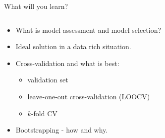 \documentclass[10pt,ignorenonframetext,]{beamer}
\providecommand{\tightlist}{%
  \setlength{\itemsep}{0pt}\setlength{\parskip}{0pt}}
\begin{document}
\begin{frame}

\begin{block}{What will you learn?}

\(~\)

\begin{itemize}
\tightlist
\item
  What is model assessment and model selection?
\end{itemize}

\vspace{2mm}

\begin{itemize}
\tightlist
\item
  Ideal solution in a data rich situation.
\end{itemize}

\vspace{2mm}

\begin{itemize}
\tightlist
\item
  Cross-validation and what is best:

  \begin{itemize}
  \tightlist
  \item
    validation set
  \item
    leave-one-out cross-validation (LOOCV)
  \item
    \(k\)-fold CV
  \end{itemize}
\end{itemize}

\vspace{2mm}

\begin{itemize}
\tightlist
\item
  Bootstrapping - how and why.
\end{itemize}

\end{block}

\end{frame}
\end{document}
